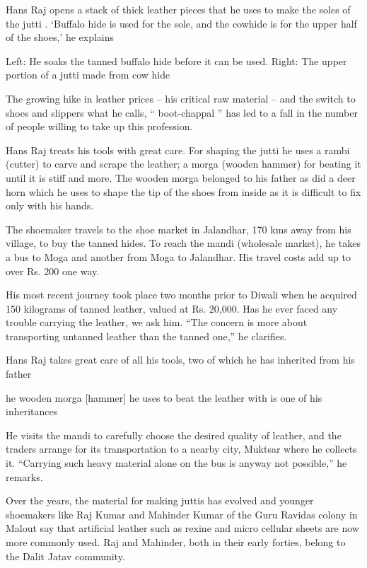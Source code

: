 \documentclass[
]{interact}
\begin{document}
Hans Raj opens a stack of thick leather pieces that he uses to make the
soles of the jutti . `Buffalo hide is used for the sole, and the cowhide
is for the upper half of the shoes,' he explains

Left: He soaks the tanned buffalo hide before it can be used. Right: The
upper portion of a jutti made from cow hide

The growing hike in leather prices -- his critical raw material -- and
the switch to shoes and slippers what he calls, `` boot-chappal '' has
led to a fall in the number of people willing to take up this
profession.

Hans Raj treats his tools with great care. For shaping the jutti he uses
a rambi (cutter) to carve and scrape the leather; a morga (wooden
hammer) for beating it until it is stiff and more. The wooden morga
belonged to his father as did a deer horn which he uses to shape the tip
of the shoes from inside as it is difficult to fix only with his hands.

The shoemaker travels to the shoe market in Jalandhar, 170 kms away from
his village, to buy the tanned hides. To reach the mandi (wholesale
market), he takes a bus to Moga and another from Moga to Jalandhar. His
travel costs add up to over Rs. 200 one way.

His most recent journey took place two months prior to Diwali when he
acquired 150 kilograms of tanned leather, valued at Rs. 20,000. Has he
ever faced any trouble carrying the leather, we ask him. ``The concern
is more about transporting untanned leather than the tanned one,'' he
clarifies.

Hans Raj takes great care of all his tools, two of which he has
inherited from his father

he wooden morga {[}hammer{]} he uses to beat the leather with is one of
his inheritances

He visits the mandi to carefully choose the desired quality of leather,
and the traders arrange for its transportation to a nearby city, Muktsar
where he collects it. ``Carrying such heavy material alone on the bus is
anyway not possible,'' he remarks.

Over the years, the material for making juttis has evolved and younger
shoemakers like Raj Kumar and Mahinder Kumar of the Guru Ravidas colony
in Malout say that artificial leather such as rexine and micro cellular
sheets are now more commonly used. Raj and Mahinder, both in their early
forties, belong to the Dalit Jatav community.
\end{document}
